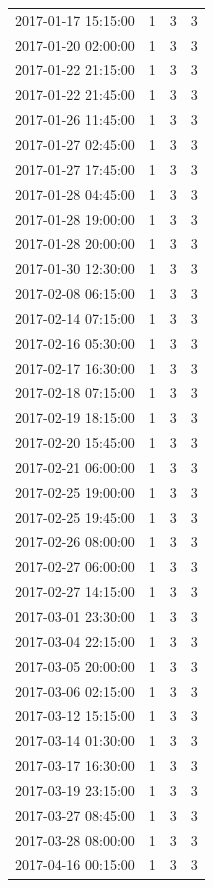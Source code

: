 \begin{tabular}{lrrr}
2017-01-17 15:15:00 & 1 & 3 & 3 \\
2017-01-20 02:00:00 & 1 & 3 & 3 \\
2017-01-22 21:15:00 & 1 & 3 & 3 \\
2017-01-22 21:45:00 & 1 & 3 & 3 \\
2017-01-26 11:45:00 & 1 & 3 & 3 \\
2017-01-27 02:45:00 & 1 & 3 & 3 \\
2017-01-27 17:45:00 & 1 & 3 & 3 \\
2017-01-28 04:45:00 & 1 & 3 & 3 \\
2017-01-28 19:00:00 & 1 & 3 & 3 \\
2017-01-28 20:00:00 & 1 & 3 & 3 \\
2017-01-30 12:30:00 & 1 & 3 & 3 \\
2017-02-08 06:15:00 & 1 & 3 & 3 \\
2017-02-14 07:15:00 & 1 & 3 & 3 \\
2017-02-16 05:30:00 & 1 & 3 & 3 \\
2017-02-17 16:30:00 & 1 & 3 & 3 \\
2017-02-18 07:15:00 & 1 & 3 & 3 \\
2017-02-19 18:15:00 & 1 & 3 & 3 \\
2017-02-20 15:45:00 & 1 & 3 & 3 \\
2017-02-21 06:00:00 & 1 & 3 & 3 \\
2017-02-25 19:00:00 & 1 & 3 & 3 \\
2017-02-25 19:45:00 & 1 & 3 & 3 \\
2017-02-26 08:00:00 & 1 & 3 & 3 \\
2017-02-27 06:00:00 & 1 & 3 & 3 \\
2017-02-27 14:15:00 & 1 & 3 & 3 \\
2017-03-01 23:30:00 & 1 & 3 & 3 \\
2017-03-04 22:15:00 & 1 & 3 & 3 \\
2017-03-05 20:00:00 & 1 & 3 & 3 \\
2017-03-06 02:15:00 & 1 & 3 & 3 \\
2017-03-12 15:15:00 & 1 & 3 & 3 \\
2017-03-14 01:30:00 & 1 & 3 & 3 \\
2017-03-17 16:30:00 & 1 & 3 & 3 \\
2017-03-19 23:15:00 & 1 & 3 & 3 \\
2017-03-27 08:45:00 & 1 & 3 & 3 \\
2017-03-28 08:00:00 & 1 & 3 & 3 \\
2017-04-16 00:15:00 & 1 & 3 & 3 \\

\end{tabular}
